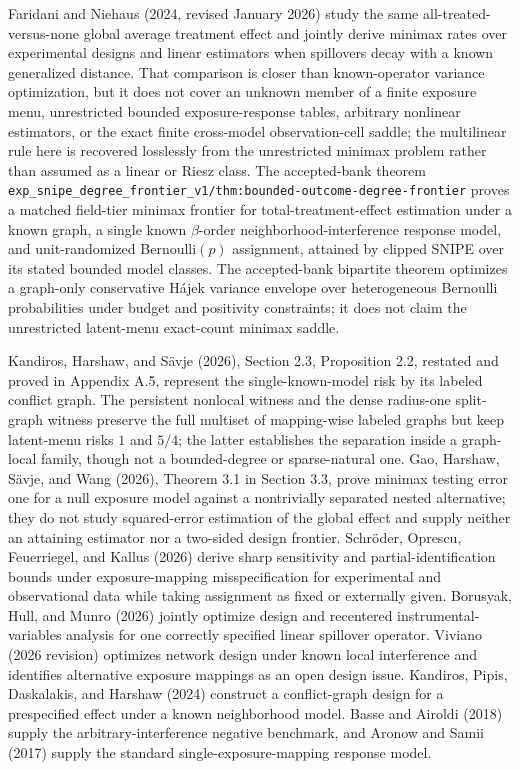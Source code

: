 Faridani and Niehaus (2024, revised January 2026) study the same all-treated-versus-none global average treatment effect and jointly derive minimax rates over experimental designs and linear estimators when spillovers decay with a known generalized distance. That comparison is closer than known-operator variance optimization, but it does not cover an unknown member of a finite exposure menu, unrestricted bounded exposure-response tables, arbitrary nonlinear estimators, or the exact finite cross-model observation-cell saddle; the multilinear rule here is recovered losslessly from the unrestricted minimax problem rather than assumed as a linear or Riesz class. The accepted-bank theorem \texttt{exp\_snipe\_degree\_frontier\_v1/thm:bounded-outcome-degree-frontier} proves a matched field-tier minimax frontier for total-treatment-effect estimation under a known graph, a single known \(\beta\)-order neighborhood-interference response model, and unit-randomized Bernoulli\((p)\) assignment, attained by clipped SNIPE over its stated bounded model classes. The accepted-bank bipartite theorem optimizes a graph-only conservative H\'ajek variance envelope over heterogeneous Bernoulli probabilities under budget and positivity constraints; it does not claim the unrestricted latent-menu exact-count minimax saddle.

Kandiros, Harshaw, and Sävje (2026), Section 2.3, Proposition 2.2, restated and proved in Appendix A.5, represent the single-known-model risk by its labeled conflict graph. The persistent nonlocal witness and the dense radius-one split-graph witness preserve the full multiset of mapping-wise labeled graphs but keep latent-menu risks \(1\) and \(5/4\); the latter establishes the separation inside a graph-local family, though not a bounded-degree or sparse-natural one. Gao, Harshaw, Sävje, and Wang (2026), Theorem 3.1 in Section 3.3, prove minimax testing error one for a null exposure model against a nontrivially separated nested alternative; they do not study squared-error estimation of the global effect and supply neither an attaining estimator nor a two-sided design frontier. Schröder, Oprescu, Feuerriegel, and Kallus (2026) derive sharp sensitivity and partial-identification bounds under exposure-mapping misspecification for experimental and observational data while taking assignment as fixed or externally given. Borusyak, Hull, and Munro (2026) jointly optimize design and recentered instrumental-variables analysis for one correctly specified linear spillover operator. Viviano (2026 revision) optimizes network design under known local interference and identifies alternative exposure mappings as an open design issue. Kandiros, Pipis, Daskalakis, and Harshaw (2024) construct a conflict-graph design for a prespecified effect under a known neighborhood model. Basse and Airoldi (2018) supply the arbitrary-interference negative benchmark, and Aronow and Samii (2017) supply the standard single-exposure-mapping response model.

